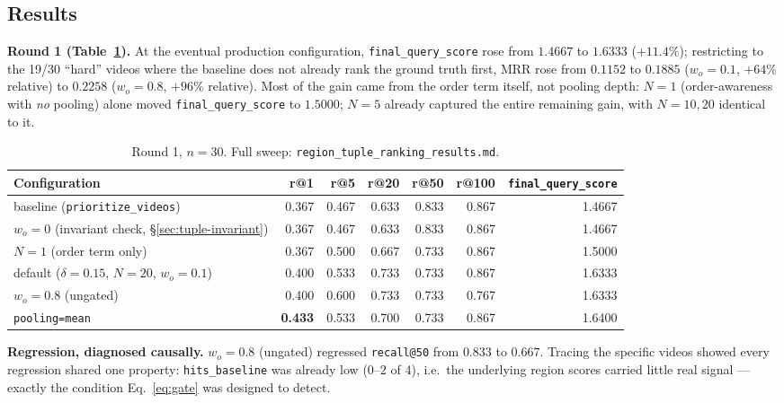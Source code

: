 \documentclass[11pt]{article}
\newcommand{\code}[1]{\texttt{\small #1}}
\newcommand{\file}[1]{\texttt{\footnotesize #1}}
\begin{document}
\subsection{Results}
\label{sec:tuple-results}

\textbf{Round 1 (Table~\ref{tab:tuple-round1}).} At the eventual production
configuration, \code{final\_query\_score} rose from $1.4667$ to $1.6333$
($+11.4\%$); restricting to the 19/30 ``hard'' videos where the baseline
does not already rank the ground truth first, MRR rose from $0.1152$ to
$0.1885$ ($w_o{=}0.1$, $+64\%$ relative) to $0.2258$ ($w_o{=}0.8$, $+96\%$
relative). Most of the gain came from the order term itself, not pooling
depth: $N{=}1$ (order-awareness with \emph{no} pooling) alone moved
\code{final\_query\_score} to $1.5000$; $N{=}5$ already captured the entire
remaining gain, with $N{=}10,20$ identical to it.

\begin{table}[h]
\centering\small
\begin{tabular}{@{}lrrrrrr@{}}
\toprule
Configuration & r@1 & r@5 & r@20 & r@50 & r@100 & \code{final\_query\_score} \\
\midrule
baseline (\code{prioritize\_videos}) & 0.367 & 0.467 & 0.633 & 0.833 & 0.867 & 1.4667 \\
$w_o{=}0$ (invariant check, \S\ref{sec:tuple-invariant}) & 0.367 & 0.467 & 0.633 & 0.833 & 0.867 & 1.4667 \\
$N{=}1$ (order term only) & 0.367 & 0.500 & 0.667 & 0.733 & 0.867 & 1.5000 \\
default ($\delta{=}0.15$, $N{=}20$, $w_o{=}0.1$) & 0.400 & 0.533 & 0.733 & 0.733 & 0.867 & 1.6333 \\
$w_o{=}0.8$ (ungated) & 0.400 & 0.600 & 0.733 & 0.733 & 0.767 & 1.6333 \\
\code{pooling=mean} & \textbf{0.433} & 0.533 & 0.700 & 0.733 & 0.867 & 1.6400 \\
\bottomrule
\end{tabular}
\caption{Round 1, $n=30$. Full sweep: \file{region\_tuple\_ranking\_results.md}.}
\label{tab:tuple-round1}
\end{table}

\textbf{Regression, diagnosed causally.} $w_o{=}0.8$ (ungated) regressed
\code{recall@50} from $0.833$ to $0.667$. Tracing the specific videos showed
every regression shared one property: \code{hits\_baseline} was already low
($0$--$2$ of 4), i.e.\ the underlying region scores carried little real
signal --- exactly the condition Eq.~\ref{eq:gate} was designed to detect.
\end{document}

